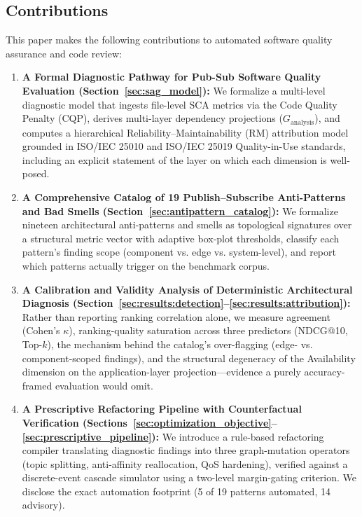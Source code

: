 \subsection{Contributions}
\label{sec:intro:contributions}

This paper makes the following contributions to automated software quality assurance and code review:
\begin{enumerate}
    \item \textbf{A Formal Diagnostic Pathway for Pub-Sub Software Quality Evaluation (Section~\ref{sec:sag_model}):} We formalize a multi-level diagnostic model that ingests file-level SCA metrics via the Code Quality Penalty (CQP), derives multi-layer dependency projections ($G_{\text{analysis}}$), and computes a hierarchical Reliability--Maintainability (RM) attribution model grounded in ISO/IEC 25010 and ISO/IEC 25019 Quality-in-Use standards, including an explicit statement of the layer on which each dimension is well-posed.
    \item \textbf{A Comprehensive Catalog of 19 Publish--Subscribe Anti-Patterns and Bad Smells (Section~\ref{sec:antipattern_catalog}):} We formalize nineteen architectural anti-patterns and smells as topological signatures over a structural metric vector with adaptive box-plot thresholds, classify each pattern's finding scope (component vs. edge vs. system-level), and report which patterns actually trigger on the benchmark corpus.
    \item \textbf{A Calibration and Validity Analysis of Deterministic Architectural Diagnosis (Section~\ref{sec:results:detection}--\ref{sec:results:attribution}):} Rather than reporting ranking correlation alone, we measure agreement (Cohen's $\kappa$), ranking-quality saturation across three predictors (NDCG@10, Top-$k$), the mechanism behind the catalog's over-flagging (edge- vs. component-scoped findings), and the structural degeneracy of the Availability dimension on the application-layer projection---evidence a purely accuracy-framed evaluation would omit.
    \item \textbf{A Prescriptive Refactoring Pipeline with Counterfactual Verification (Sections~\ref{sec:optimization_objective}--\ref{sec:prescriptive_pipeline}):} We introduce a rule-based refactoring compiler translating diagnostic findings into three graph-mutation operators (topic splitting, anti-affinity reallocation, QoS hardening), verified against a discrete-event cascade simulator using a two-level margin-gating criterion. We disclose the exact automation footprint (5 of 19 patterns automated, 14 advisory).

\end{enumerate}
